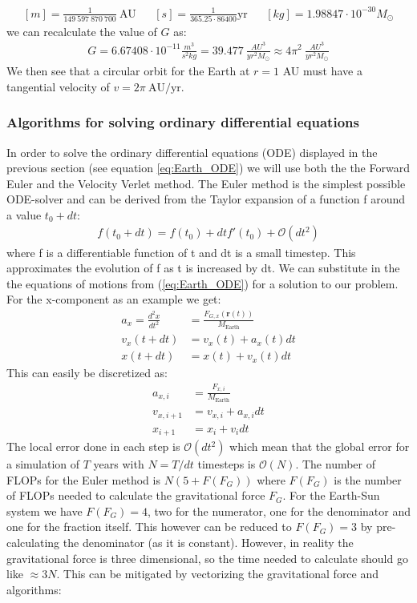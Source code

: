 \documentclass[american,a4paper,12pt]{article}
\renewcommand{\vec}[1]{\mathbf{#1}} %
\newcommand{\ME}{\ensuremath{M_{\text{Earth}}}} %
\newcommand{\MS}{\ensuremath{M_{\odot}}} %
\begin{document}
\begin{align*}
     &[m] = \frac{1}{149\ 597\ 870\ 700} \ \text{AU}&  &[s] = \frac{1}{365.25 \cdot 86400} \text{yr}&   &[kg] = 1.98847\cdot 10^{-30} \MS&
\end{align*}
we can recalculate the value of $G$ as:
\begin{align*}
    G = 6.67408 \cdot 10^{-11} \frac{m^3}{s^2 kg} = 39.477 \ \frac{AU^3}{yr^2\MS}  \approx 4 \pi^2 \ \frac{AU^3}{yr^2\MS}
\end{align*}
We then see that a circular orbit for the Earth at $r = 1$ AU must have a tangential velocity of $v = 2 \pi\ \text{AU/yr}$.

\newpage
\subsubsection{Algorithms for solving ordinary differential equations}
In order to solve the ordinary differential equations (ODE) displayed in the previous section (see equation \ref{eq:Earth_ODE}) we will use both the the Forward Euler and the Velocity Verlet method. The Euler method is the simplest possible ODE-solver and can be derived from the Taylor expansion of a function f around a value $t_0+dt$:
\begin{align*}
    f(t_0 + dt) = f(t_0) + dtf'(t_0) + \mathcal{O}(dt^2)
\end{align*}
where f is a differentiable function of t and dt is a small timestep. This approximates the evolution of f as t is increased by dt.  We can substitute in the the equations of motions from (\ref{eq:Earth_ODE}) for a solution to our problem. For the x-component as an example we get:
\begin{align*}
    a_x = \frac{d^2x}{dt^2} &= \frac{F_{G,x}(\vec{r}(t))}{\ME} \\
    v_x(t+dt) &= v_x(t) + a_x(t)dt\\
    x(t+dt) &= x(t) + v_x(t)dt
\end{align*}
This can easily be discretized as:
\begin{align*}
    a_{x,i} &= \frac{F_{x,i}}{\ME} \\
    v_{x,i+1} &= v_{x,i} + a_{x,i}dt\\
    x_{i+1} &= x_i + v_i dt
\end{align*}
The local error done in each step is $\mathcal{O}(dt^2)$ which mean that the global error for a simulation of $T$ years with $N = T/dt$ timesteps is $\mathcal{O}(N)$. The number of FLOPs for the Euler method is $N(5 + F(F_G))$ where $F(F_G)$ is the number of FLOPs needed to calculate the gravitational force $F_G$. For the Earth-Sun system we have $F(F_G) = 4$, two for the numerator, one for the denominator and one for the fraction itself. This however can be reduced to $F(F_G) = 3$ by pre-calculating the denominator (as it is constant). However, in reality the gravitational force is three dimensional, so the time needed to calculate should go like $\approx 3N$. This can be mitigated by vectorizing the gravitational force and algorithms:
\end{document}

